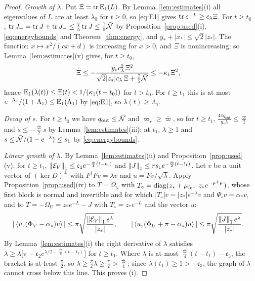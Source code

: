 \begin{proof}
\emph{Growth of $\lambda$.} Put $\Xi=\operatorname{tr}\mathrm E_1(L)$. By
Lemma~\ref{lem:estimates}(i) all eigenvalues of $L$ are at least $\lambda_0$
for $t\geq0$, so \eqref{eq:E1} gives $\operatorname{tr} e^{-L}\geq c_\lambda\Xi$. For
$t\geq t_0$, $\operatorname{tr} J_+=\operatorname{tr} J+\operatorname{tr} J_-\leq\frac75\operatorname{tr} J\leq\frac75\bar{\mathcal N}$ by
Proposition~\ref{prop:used}(i), \eqref{eq:energybounds} and
Theorem~\ref{thm:energy}, and $y_\ast+|x_\ast|\leq\sqrt2|z_\ast|$. The
function $x\mapsto x^2/(cx+d)$ is increasing for $x>0$, and $\Xi$ is
nonincreasing; so Lemma~\ref{lem:estimates}(v) gives, for $t\geq t_0$,
\[
 \dot\Xi\leq-\frac{y_\ast c_\lambda^2\,\Xi^2}{\sqrt2|z_\ast|c_\lambda\,\Xi+\frac75\bar{\mathcal N}}
 \leq-\kappa_1\Xi^2,
\]
hence $\mathrm E_1(\lambda(t))\leq\Xi(t)<1/(\kappa_1(t-t_0))$ for $t>t_0$. For
$t\geq t_1$ this is at most $e^{-\Lambda_1}/(1+\Lambda_1)\leq\mathrm E_1(\Lambda_1)$
by \eqref{eq:E1}, so $\lambda(t)\geq\Lambda_1$.

\emph{Decay of $s$.} For $t\geq t_0$ we have $q_{\mathrm{out}}\leq\bar{\mathcal N}$ and
$\varpi_\star\geq\bar\varpi$, so for $t\geq t_1$,
$\frac{4\pi q_{\mathrm{out}}}{y_\ast\lambda}\leq\frac{\bar\varpi}2$ and
$\dot s\leq-\frac{\bar\varpi}2s$ by Lemma~\ref{lem:estimates}(iii); at $t_1$,
$\lambda\geq1$ and $s\leq\bar{\mathcal N}/(1-e^{-\lambda})\leq s_1$ by
\eqref{eq:energybounds}.

\emph{Linear growth of $\lambda$.} By Lemma~\ref{lem:estimates}(ii) and
Proposition~\ref{prop:used}(v), for $t\geq t_1$,
$\left\lVert\mathcal E_V\right\rVert_1\leq\mathfrak c_1e^{-\frac{\bar\varpi}4(t-t_1)}$ and
$\left\lVert J\right\rVert_1\leq rs_1e^{-\frac{\bar\varpi}2(t-t_1)}$. Let $v$ be a unit vector of
$(\ker D)^\perp$ with $F^\dagger Fv=\lambda v$ and $u=Fv/\sqrt\lambda$. Apply
Proposition~\ref{prop:used}(iv) to $T=\Omega_V$ with
$T_\circ=\operatorname{diag}(z_\ast+\mu_{i_0},\ z_\ast e^{-F^\dagger F})$, whose first
block is normal and invertible and for which
$|T_\circ|v=|z_\ast|e^{-\lambda}v$ and $\Psi_\circ v=\alpha_\ast v$, and to
$T=-\Omega_U=z_\ast e^{-L}-J$ with $T_\circ=z_\ast e^{-L}$ and the vector
$u$:
\[
 |\left\langle v,(\Phi_V-\alpha_\ast)v\right\rangle|\leq\pi\sqrt{\frac{\left\lVert\mathcal E_V\right\rVert_1e^\lambda}{|z_\ast|}},
 \qquad
 |\left\langle u,(\Phi_U+\pi-\alpha_\ast)u\right\rangle|\leq\pi\sqrt{\frac{\left\lVert J\right\rVert_1e^\lambda}{|z_\ast|}} .
\]
By Lemma~\ref{lem:estimates}(i) the right derivative of $\lambda$ satisfies
$\dot\lambda\geq\lambda\bigl[\pi-\mathfrak c_2e^{\lambda/2-\frac{\bar\varpi}8(t-t_1)}\bigr]$
for $t\geq t_1$. Where $\lambda$ is at most
$\frac{\bar\varpi}4(t-t_1)-\mathfrak c_3$, the bracket is at least $\frac\pi2$, so
$\dot\lambda\geq\frac\pi2\lambda\geq\frac\pi2>\frac{\bar\varpi}4$; since
$\lambda(t_1)\geq1>-\mathfrak c_3$, the graph of $\lambda$ cannot cross below
this line. This proves (i).


\end{proof}
